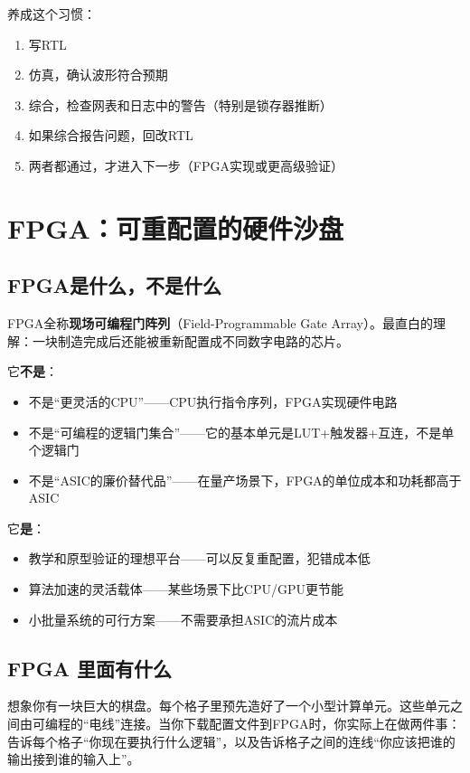 \documentclass[11pt,a4paper]{article}
\begin{document}
养成这个习惯：
\begin{enumerate}
  \item 写RTL
  \item 仿真，确认波形符合预期
  \item 综合，检查网表和日志中的警告（特别是锁存器推断）
  \item 如果综合报告问题，回改RTL
  \item 两者都通过，才进入下一步（FPGA实现或更高级验证）
\end{enumerate}

\section{FPGA：可重配置的硬件沙盘}

\subsection{FPGA是什么，不是什么}

FPGA全称\textbf{现场可编程门阵列}（Field-Programmable Gate Array）。最直白的理解：一块制造完成后还能被重新配置成不同数字电路的芯片。

它\textbf{不是}：
\begin{itemize}
  \item 不是``更灵活的CPU''——CPU执行指令序列，FPGA实现硬件电路
  \item 不是``可编程的逻辑门集合''——它的基本单元是LUT+触发器+互连，不是单个逻辑门
  \item 不是``ASIC的廉价替代品''——在量产场景下，FPGA的单位成本和功耗都高于ASIC
\end{itemize}

它\textbf{是}：
\begin{itemize}
  \item 教学和原型验证的理想平台——可以反复重配置，犯错成本低
  \item 算法加速的灵活载体——某些场景下比CPU/GPU更节能
  \item 小批量系统的可行方案——不需要承担ASIC的流片成本
\end{itemize}

\subsection{FPGA 里面有什么}

想象你有一块巨大的棋盘。每个格子里预先造好了一个小型计算单元。这些单元之间由可编程的``电线''连接。当你下载配置文件到FPGA时，你实际上在做两件事：告诉每个格子``你现在要执行什么逻辑''，以及告诉格子之间的连线``你应该把谁的输出接到谁的输入上''。
\end{document}
